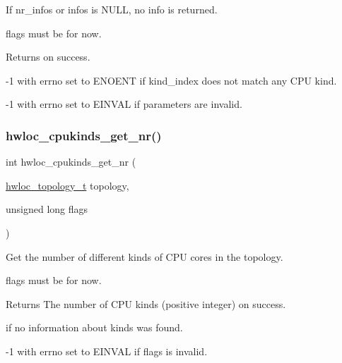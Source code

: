 If {\ttfamily nr\+\_\+infos} or {\ttfamily infos} is {\ttfamily N\+U\+LL}, no info is returned.

{\ttfamily flags} must be {} for now.

\begin{DoxyReturn}{Returns}
{} on success. 

{\ttfamily -\/1} with {\ttfamily errno} set to {\ttfamily E\+N\+O\+E\+NT} if {\ttfamily kind\+\_\+index} does not match any C\+PU kind. 

{\ttfamily -\/1} with {\ttfamily errno} set to {\ttfamily E\+I\+N\+V\+AL} if parameters are invalid. 
\end{DoxyReturn}
\mbox{\label{a00213_ga7553f7c6d3920b169f3fc18dfe6a33e3}} 
\subsubsection{\texorpdfstring{hwloc\+\_\+cpukinds\+\_\+get\+\_\+nr()}{hwloc\_cpukinds\_get\_nr()}}
{\footnotesize\ttfamily int hwloc\+\_\+cpukinds\+\_\+get\+\_\+nr (\begin{DoxyParamCaption}\item[{\hyperlink{a00186_ga9d1e76ee15a7dee158b786c30b6a6e38}{hwloc\+\_\+topology\+\_\+t}}]{topology,  }\item[{unsigned long}]{flags }\end{DoxyParamCaption})}



Get the number of different kinds of C\+PU cores in the topology. 

{\ttfamily flags} must be {} for now.

\begin{DoxyReturn}{Returns}
The number of C\+PU kinds (positive integer) on success. 

{} if no information about kinds was found. 

{\ttfamily -\/1} with {\ttfamily errno} set to {\ttfamily E\+I\+N\+V\+AL} if {\ttfamily flags} is invalid. 
\end{DoxyReturn}
\mbox{\label{a00213_ga6164ba92cfd06f530ec2c4a18a0dd5a9}} 
